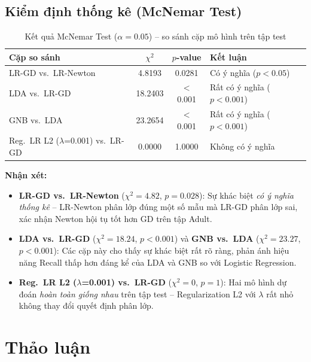 \documentclass[12pt, a4paper]{article}
\begin{document}
\subsection{Kiểm định thống kê (McNemar Test)}

\begin{table}[H]
  \centering
  \caption{Kết quả McNemar Test ($\alpha = 0.05$) -- so sánh cặp mô hình trên tập test}
  \label{tab:mcnemar}
  \begin{tabular}{lccl}
    \toprule
    \textbf{Cặp so sánh} & $\chi^2$ & $p$-value & \textbf{Kết luận} \\
    \midrule
    LR-GD vs.\ LR-Newton          & 4.8193  & 0.0281  & Có ý nghĩa ($p < 0.05$) \\
    LDA   vs.\ LR-GD              & 18.2403 & $<$0.001 & Rất có ý nghĩa ($p < 0.001$) \\
    GNB   vs.\ LDA                & 23.2654 & $<$0.001 & Rất có ý nghĩa ($p < 0.001$) \\
    Reg.\ LR L2 ($\lambda$=0.001) vs.\ LR-GD & 0.0000 & 1.0000 & Không có ý nghĩa \\
    \bottomrule
  \end{tabular}
\end{table}

\noindent\textbf{Nhận xét:}
\begin{itemize}
  \item \textbf{LR-GD vs.\ LR-Newton} ($\chi^2 = 4.82$, $p = 0.028$): Sự khác biệt \emph{có ý nghĩa thống kê} -- LR-Newton phân lớp đúng một số mẫu mà LR-GD phân lớp sai, xác nhận Newton hội tụ tốt hơn GD trên tập Adult.
  \item \textbf{LDA vs.\ LR-GD} ($\chi^2 = 18.24$, $p < 0.001$) và \textbf{GNB vs.\ LDA} ($\chi^2 = 23.27$, $p < 0.001$): Các cặp này cho thấy sự khác biệt rất rõ ràng, phản ánh hiệu năng Recall thấp hơn đáng kể của LDA và GNB so với Logistic Regression.
  \item \textbf{Reg.\ LR L2 ($\lambda$=0.001) vs.\ LR-GD} ($\chi^2 = 0$, $p = 1$): Hai mô hình dự đoán \emph{hoàn toàn giống nhau} trên tập test -- Regularization L2 với $\lambda$ rất nhỏ không thay đổi quyết định phân lớp.
\end{itemize}

\section{Thảo luận}
\label{sec:discussion}
\end{document}
